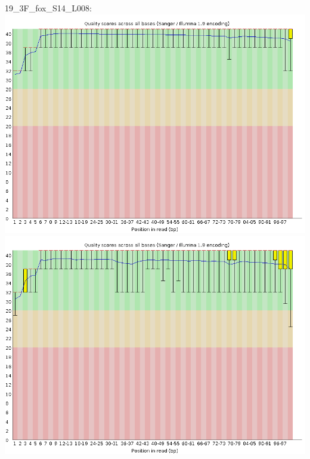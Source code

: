 \documentclass[
]{article}
\begin{document}
19\_3F\_fox\_S14\_L008:
\includegraphics{fastqc_plots/19_3F_fox_S14_L008_R1_001_perbasequality.png}
\includegraphics{fastqc_plots/19_3F_fox_S14_L008_R2_001_perbasequality.png}
\end{document}
